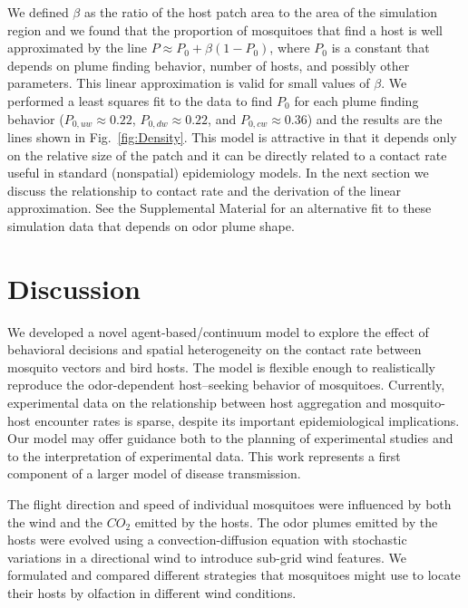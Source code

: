 \documentclass[10pt]{article}
\newif\ifnotesw
\newcommand{\notes}[1]{\ifnotesw  $\bullet$\ \textit{ \textbf{#1}}\ $\bullet$ \fi}
\begin{document}
We defined $\beta$ as the ratio of the host patch area to the area of the simulation region and we found that the proportion of mosquitoes that find a host is well approximated by the line $P  \approx P_0 + \beta(1-P_0)$, where $P_0$ is a constant that depends on plume finding behavior, number of hosts, and possibly other parameters. This linear approximation is valid for small values of $\beta$.  We performed a least squares fit to the data to find $P_0$ for each plume finding behavior ($P_{0,uw} \approx 0.22$, $P_{0,dw} \approx 0.22$, and $P_{0,cw} \approx 0.36$) and the results are the lines shown in Fig.~\ref{fig:Density}.
This model is attractive in that it depends only on the relative size of the patch and it can be directly related to a contact rate useful in standard (nonspatial) epidemiology models. In the next section we discuss the relationship to contact rate and the derivation of the linear approximation. See the Supplemental Material for an alternative fit to these simulation data that depends on odor plume shape.


\section*{Discussion}\label{sec:summary}
	 	We developed a novel agent-based/continuum model
to explore the effect of behavioral decisions and spatial heterogeneity on the contact
rate between mosquito vectors and bird hosts. The model is flexible enough to
realistically reproduce the odor-dependent host--seeking
behavior of mosquitoes. Currently,
experimental data on the relationship between host aggregation and mosquito-host encounter rates is sparse, despite its important epidemiological implications. Our
model may offer guidance both to the planning of experimental
studies and to the interpretation of experimental data.  This work represents a first component
of  a larger model of disease transmission.


The flight direction and speed of individual mosquitoes were influenced by both the wind and the $CO_2$
emitted by the hosts. The odor plumes emitted by the hosts were
evolved using a convection-diffusion equation with stochastic
variations in a directional wind to introduce sub-grid wind features. We formulated and compared
different strategies that mosquitoes might use to locate their hosts by olfaction in different wind
conditions.
\end{document}
